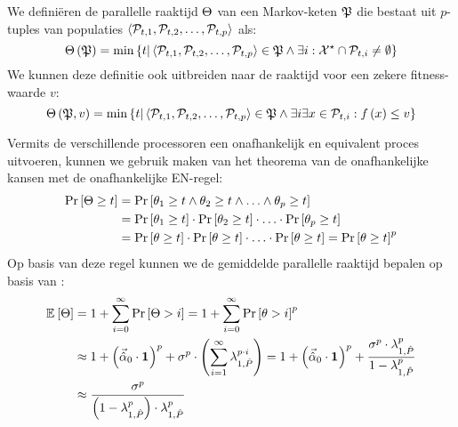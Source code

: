 \begin{definition}
We defini\"eren de parallelle raaktijd $\Theta$ van een Markov-keten $\mathfrak{P}$ die bestaat uit $p$-tuples van populaties $\left\langle \mathcal{P}_{t,1},\mathcal{P}_{t,2},\ldots,\mathcal{P}_{t,p}\right\rangle$ als:
\begin{equation}
\Theta\left(\mathfrak{P}\right)=\min\left\{ t|\left\langle \mathcal{P}_{t,1},\mathcal{P}_{t,2},\ldots,\mathcal{P}_{t,p}\right\rangle\in\mathfrak{P}\wedge\exists i:\mathcal{X}^{\star}\cap \mathcal{P}_{t,i}\neq\emptyset\right\}
\end{equation}
We kunnen deze definitie ook uitbreiden naar de raaktijd voor een zekere fitness-waarde $v$:
\begin{equation}
\Theta\left(\mathfrak{P},v\right)=\min\left\{ t|\left\langle \mathcal{P}_{t,1},\mathcal{P}_{t,2},\ldots,\mathcal{P}_{t,p}\right\rangle\in\mathfrak{P}\wedge\exists i\exists x\in\mathcal{P}_{t,i}:f\left(x\right)\leq v\right\}
\end{equation}
\end{definition}
Vermits de verschillende processoren een onafhankelijk en equivalent proces uitvoeren, kunnen we gebruik maken van het theorema van de onafhankelijke kansen met de onafhankelijke EN-regel:
\begin{equation}
\begin{aligned}
\Prob{\phittime\geq t}&=\Prob{\hittime_1\geq t\wedge\hittime_2\geq t\wedge\ldots\wedge\hittime_p\geq t}\\
&=\Prob{\hittime_1\geq t}\cdot\Prob{\hittime_2\geq t}\cdot\ldots\cdot\Prob{\hittime_p\geq t}\\
&=\Prob{\hittime\geq t}\cdot\Prob{\hittime\geq t}\cdot\ldots\cdot\Prob{\hittime\geq t}=\Prob{\hittime\geq t}^p
\end{aligned}
\eqnlab{probabilityPower}
\end{equation}
Op basis van deze regel kunnen we de gemiddelde parallelle raaktijd bepalen op basis van :
\begin{equation}
\begin{aligned}
\mean{\phittime}&=1+\displaystyle\sum_{i=0}^{\infty}{\Prob{\phittime>i}}=1+\displaystyle\sum_{i=0}^{\infty}{\Prob{\hittime>i}^p}\\
&\approx 1+\brak{\vec{\hat{\alpha}}_0\cdot\onematrix}^p+\sigma^p\cdot\brak{\displaystyle\sum_{i=1}^{\infty}\lambda_{1,\hat{P}}^{p\cdot i}}=1+\brak{\vec{\hat{\alpha}}_0\cdot\onematrix}^p+\displaystyle\frac{\sigma^p\cdot\lambda_{1,\hat{P}}^p}{1-\lambda_{1,\hat{P}}^p}\\
&\approx\displaystyle\frac{\sigma^p}{\brak{1-\lambda_{1,\hat{P}}^p}\cdot\lambda_{1,\hat{P}}^{p}}
\end{aligned}
\eqnlab{probabilityPower}
\end{equation}
